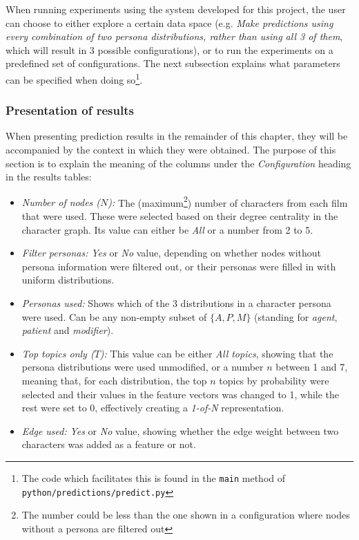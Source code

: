 \documentclass[bsc,frontabs,deptreport,singlespacing,parskip, twoside]{infthesis}
\begin{document}
When running experiments using the system developed for this project, the user can choose to either explore a certain data space (e.g. \textit{Make predictions using every combination of two persona distributions, rather than using all 3 of them}, which will result in 3 possible configurations), or to run the experiments on a predefined set of configurations. The next subsection explains what parameters can be specified when doing so\footnote{The code which facilitates this is found in the \texttt{main} method of \texttt{python/predictions/predict.py}}. 

\subsubsection{Presentation of results}
When presenting prediction results in the remainder of this chapter, they will be accompanied by the context in which they were obtained. The purpose of this section is to explain the meaning of the columns under the \textit{Configuration} heading in the results tables:
\begin{itemize}
	\item \textit{Number of nodes ($N$):} The (maximum\footnote{The number could be less than the one shown in a configuration where nodes without a persona are filtered out}) number of characters from each film that were used. These were selected based on their degree centrality in the character graph. Its value can either be \textit{All} or a number from 2 to 5.
	\item \textit{Filter personas:} \textit{Yes} or \textit{No} value, depending on whether nodes without persona information were filtered out, or their personas were filled in with uniform distributions.
	\item \textit{Personas used:} Shows which of the 3 distributions in a character persona were used. Can be any non-empty subset of $\{A, P, M\}$ (standing for \textit{agent}, \textit{patient} and \textit{modifier}).
	\item \textit{Top topics only ($T$):} This value can be either \textit{All topics}, showing that the persona distributions were used unmodified, or a number $n$ between 1 and 7, meaning that, for each distribution, the top $n$ topics by probability were selected and their values in the feature vectors was changed to 1, while the rest were set to 0, effectively creating a \textit{1-of-N} representation.
	\item \textit{Edge used:} \textit{Yes} or \textit{No} value, showing whether the edge weight between two characters was added as a feature or not.
\end{itemize}
\end{document}
